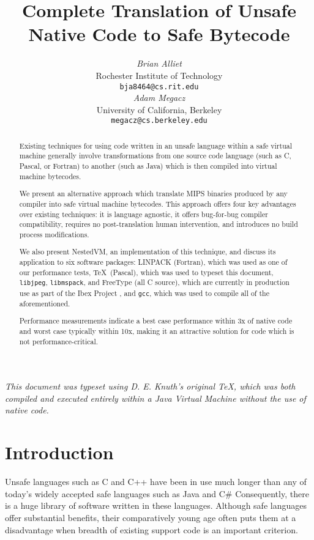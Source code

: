 \documentclass{acmconf}
\title{\textbf{\textsf{
Complete Translation of Unsafe Native Code to Safe Bytecode
}}}
\date{}
\author{\begin{tabular}{@{}c@{}}
        {\em {Brian Alliet}} \\
        {Rochester Institute of Technology}\\
        {\tt bja8464@cs.rit.edu}
   \end{tabular}\hskip 1in\begin{tabular}{@{}c@{}}
        {\em {Adam Megacz}} \\
        {University of California, Berkeley} \\
        {\tt megacz@cs.berkeley.edu}
\end{tabular}}
\begin{document}
\maketitle

{\it This document was typeset using D. E. Knuth's original \TeX ,
     which was both compiled and executed entirely within a Java
     Virtual Machine without the use of native code.}

\begin{abstract}

Existing techniques for using code written in an unsafe language
within a safe virtual machine generally involve transformations from
one source code language (such as C, Pascal, or Fortran) to another
(such as Java) which is then compiled into virtual machine bytecodes.

We present an alternative approach which translate MIPS binaries
produced by any compiler into safe virtual machine bytecodes.  This
approach offers four key advantages over existing techniques: it is
language agnostic, it offers bug-for-bug compiler compatibility,
requires no post-translation human intervention, and introduces no
build process modifications.

We also present NestedVM, an implementation of this technique, and
discuss its application to six software packages: LINPACK (Fortran),
which was used as one of our performance tests, \TeX\ (Pascal), which
was used to typeset this document, {\tt libjpeg}, {\tt libmspack}, and
FreeType (all C source), which are currently in production use as part
of the Ibex Project \cite{ibex}, and {\tt gcc}, which was used to
compile all of the aforementioned.

Performance measurements indicate a best case performance within 3x of
native code and worst case typically within 10x, making it an
attractive solution for code which is not performance-critical.

\end{abstract}

\section{Introduction}

Unsafe languages such as C and C++ have been in use much longer than
any of today's widely accepted safe languages such as Java and C\#
Consequently, there is a huge library of software written in these
languages.  Although safe languages offer substantial benefits, their
comparatively young age often puts them at a disadvantage when breadth
of existing support code is an important criterion.
\end{document}
